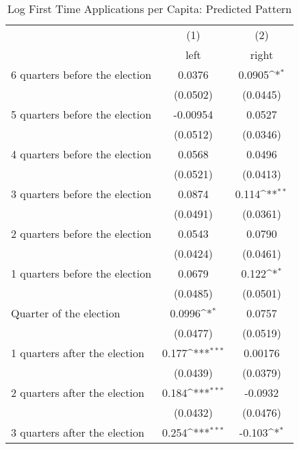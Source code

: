 \begin{table}[htbp]\centering
\def\sym#1{\ifmmode^{#1}\else\(^{#1}\)\fi}
\caption{Log First Time Applications per Capita: Predicted Pattern}
\begin{tabular}{l*{2}{c}}
\hline\hline
                    &\multicolumn{1}{c}{(1)}&\multicolumn{1}{c}{(2)}\\
                    &\multicolumn{1}{c}{left}&\multicolumn{1}{c}{right}\\
\hline
 6 quarters before the election&      0.0376         &      0.0905\sym{*}  \\
                    &    (0.0502)         &    (0.0445)         \\
[1em]
 5 quarters before the election&    -0.00954         &      0.0527         \\
                    &    (0.0512)         &    (0.0346)         \\
[1em]
 4 quarters before the election&      0.0568         &      0.0496         \\
                    &    (0.0521)         &    (0.0413)         \\
[1em]
 3 quarters before the election&      0.0874         &       0.114\sym{**} \\
                    &    (0.0491)         &    (0.0361)         \\
[1em]
 2 quarters before the election&      0.0543         &      0.0790         \\
                    &    (0.0424)         &    (0.0461)         \\
[1em]
 1 quarters before the election&      0.0679         &       0.122\sym{*}  \\
                    &    (0.0485)         &    (0.0501)         \\
[1em]
Quarter of the election&      0.0996\sym{*}  &      0.0757         \\
                    &    (0.0477)         &    (0.0519)         \\
[1em]
 1 quarters after the election&       0.177\sym{***}&     0.00176         \\
                    &    (0.0439)         &    (0.0379)         \\
[1em]
 2 quarters after the election&       0.184\sym{***}&     -0.0932         \\
                    &    (0.0432)         &    (0.0476)         \\
[1em]
 3 quarters after the election&       0.254\sym{***}&      -0.103\sym{*}  \\

\end{tabular}
\end{table}

